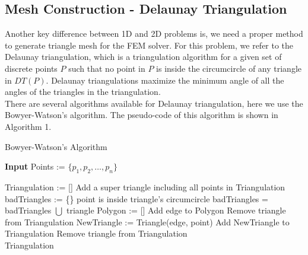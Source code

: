 \documentclass[conference]{IEEEtran}
\begin{document}
    \subsection{Mesh Construction - Delaunay Triangulation}
    Another key difference between 1D and 2D problems is, we need a proper method to generate triangle mesh for the FEM solver.
    For this problem, we refer to the Delaunay triangulation\cite{b4}\cite{b5}\cite{b7}, which is a triangulation algorithm for a given 
    set of discrete points $P$ such that no point in $P$ is inside the circumcircle of any triangle in $DT(P)$. Delaunay triangulations 
    maximize the minimum angle of all the angles of the triangles in the triangulation\cite{b4}.\\
    There are several algorithms available for Delaunay triangulation, here we use the Bowyer-Watson's algorithm\cite{b6}. The 
    pseudo-code of this algorithm is shown in Algorithm 1.\\
    \begin{algorithm}[h]  
        \caption{Bowyer-Watson's Algorithm}  
        \textbf{Input} Points := $\{p_1, p_2,\ldots, p_n\}$
            \begin{algorithmic}[1]  
                \State Triangulation := []
                \State Add a super triangle including all points in Triangulation
                    \State badTriangles := \{\}
                        \If point is inside triangle's circumcircle
                            \State badTriangles = badTriangles $\bigcup$ triangle
                        \EndIf
                    \EndFor
                    \State Polygon := []
                                \State Add edge to Polygon
                            \EndIf
                        \EndFor
                    \EndFor
                        \State Remove triangle from Triangulation
                    \EndFor
                        \State NewTriangle := Triangle(edge, point)
                        \State Add NewTriangle to Triangulation
                    \EndFor
                            \State Remove triangle from Triangulation
                        \EndIf
                    \EndFor
                \EndFor\\
                \Return Triangulation
            \end{algorithmic}  
        \end{algorithm}
\end{document}
